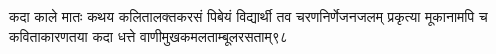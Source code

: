%
%
%
%
%
%
%
%
%
%
%
%
%

\fourlineindentedshlokanum
{कदा काले मातः कथय कलितालक्तकरसं}
{पिबेयं विद्यार्थी तव चरणनिर्णेजनजलम्}
{प्रकृत्या मूकानामपि च कविताकारणतया}
{कदा धत्ते वाणीमुखकमलताम्बूलरसताम्}{९८}

